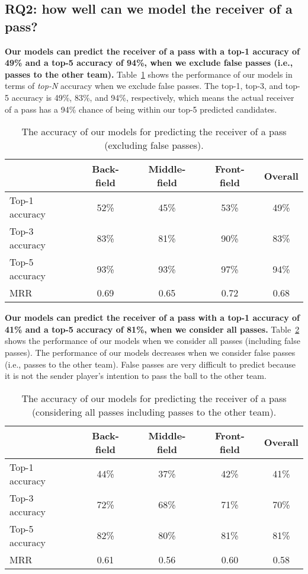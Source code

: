 \subsection{RQ2: how well can we model the receiver of a pass?}\label{RQ2-results}

\textbf{Our models can predict the receiver of a pass with a top-1 accuracy of 49\% and a top-5 accuracy of 94\%, when we exclude false passes (i.e., passes to the other team).}
Table~\ref{tab:performance-accurate-passes} shows the performance of our models in terms of \textit{top-N} accuracy when we exclude false passes. 
The top-1, top-3, and top-5 accuracy is 49\%, 83\%, and 94\%, respectively, which means the actual receiver of a pass has a 94\% chance of being within our top-5 predicted candidates.

\begin{table}[!t]
\caption{The accuracy of our models for predicting the receiver of a pass (excluding false passes).}
\centering
\begin{tabular}{lcccc}
  \hline
  & Back-field & Middle-field & Front-field & Overall \\
  \hline
  Top-1 accuracy & 52\% & 45\% & 53\% & 49\% \\
  Top-3 accuracy & 83\% & 81\% & 90\% & 83\% \\
  Top-5 accuracy & 93\% & 93\% & 97\% & 94\% \\
  MRR & 0.69 & 0.65 & 0.72 & 0.68 \\
  \hline
\end{tabular}
\label{tab:performance-accurate-passes}
\end{table}

\textbf{Our models can predict the receiver of a pass with a top-1 accuracy of 41\% and a top-5 accuracy of 81\%, when we consider all passes.}
Table~\ref{tab:performance-all-passes} shows the performance of our models when we consider all passes (including false passes). 
The performance of our models decreases when we consider false passes (i.e., passes to the other team). 
False passes are very difficult to predict because it is not the sender player's intention to pass the ball to the other team. 

\begin{table}[!t]
\caption{The accuracy of our models for predicting the receiver of a pass (considering all passes including passes to the other team).}
\centering
\begin{tabular}{lcccc}
  \hline
  & Back-field & Middle-field & Front-field & Overall \\
  \hline
  Top-1 accuracy & 44\% & 37\% & 42\% & 41\% \\
  Top-3 accuracy & 72\% & 68\% & 71\% & 70\% \\
  Top-5 accuracy & 82\% & 80\% & 81\% & 81\% \\
  MRR & 0.61 & 0.56 & 0.60 & 0.58 \\
  \hline
\end{tabular}
\label{tab:performance-all-passes}
\end{table}

